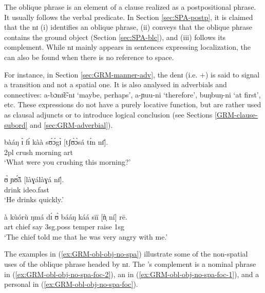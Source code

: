 \begin{exe}
\begin{exe}
\begin{exe}
The oblique phrase   is an element of a clause realized as a postpositional phrase. It usually follows the verbal predicate.  In Section \ref{sec:SPA-postp},  it is claimed that the  {\sls nɪ} (i) identifies an oblique phrase, (ii) conveys that the oblique phrase contains the ground object  (Section \ref{sec:SPA-blc}), and (iii) follows its complement. While {\sls nɪ} mainly appears in sentences expressing localization, the  can also be found when there is no  reference to space. 

For instance, in Section \ref{sec:GRM-manner-adv},  the  {\sls denɪ} (i.e. {\dem}+{\postp}) is said to signal a  transition and not a spatial one.  It is also analysed in adverbials and connectives: {\sls a-bɔnɪ̃ɛ̃-nɪ} `maybe, perhaps', {\sls a-ɲuu-ni} `therefore', {\sls buŋbuŋ-ni} `at first', etc. These expressions do not have a purely locative function, but are rather used as clausal adjuncts or to introduce logical conclusion (see Sections   \ref{GRM-clause-subord} and \ref{sec:GRM-adverbial}). 


\ea\label{ex:GRM-obl-obj-no-spa}

\ea\label{ex:GRM-obl-obj-no-spa-foc-2}
\gll bàáŋ ɪ̀ fɪ́ kàà sʊ́ɔ́gɪ̀ [tʃʊ̀ɔ̀sá tɪ́n nɪ̄].\\
 {\q} {\sc 2pl} {\pst} {\egr} crush  morning {\sc art} {\postp}\\
\glt  `What were you crushing this morning?' 

\ex\label{ex:GRM-obl-obj-no-spa-foc-1}
\gll ʊ̀ ɲʊ̃́ã́  [làɣálàɣá nɪ̄].\\
   {\psg} drink {\sc ideo}.fast {\postp}\\
\glt  `He drinks quickly.' 

\ex\label{ex:GRM-obl-obj-no-spa-foc}
\gll à kùórù ŋmá dɪ́ ʊ̀ bááŋ káá sīī [ǹ̩ ní] rē.\\
{\sc art} chief say {\comp} {\sc 3sg.poss} temper {\egr} raise {\sc 1sg} {\postp}
{\foc}\\
\glt  `The chief told me that he was very angry with me.' 

\z 
 \z

 The examples in (\ref{ex:GRM-obl-obj-no-spa}) illustrate some of the non-spatial uses of the oblique phrase headed by {\sls nɪ}. The 's complement is a  nominal phrase in (\ref{ex:GRM-obl-obj-no-spa-foc-2}), an  in  (\ref{ex:GRM-obl-obj-no-spa-foc-1}),  and a personal  in (\ref{ex:GRM-obl-obj-no-spa-foc}).


\end{exe}
\end{exe}
\end{exe}

